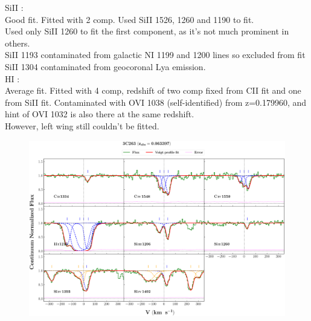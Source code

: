 \documentclass[12pt,draft]{report}
\begin{document}
SiII :  \\  \hspace*{1.5cm}
        Good fit. Fitted with 2 comp. Used SiII 1526, 1260 and 1190 to fit. \\
        Used only SiII 1260 to fit the first component, as it's not much prominent in others. \\
        SiII 1193 contaminated from galactic NI 1199 and 1200 lines so excluded from fit \\
        SiII 1304 contaminated from geocoronal Lya emission. \\

HI :  \\  \hspace*{1.5cm}
        Average fit. Fitted with 4 comp, redshift of two comp fixed from CII fit and one from SiII fit. Contaminated with OVI 1038 (self-identified) from z=0.179960, and hint of OVI 1032 is also there at the same redshift. \\
        However, left wing still couldn't be fitted.


\newpage

\begin{landscape}

\begin{figure}
    \centering
    \vspace{-20mm}
    \hspace*{-35mm}
    \includegraphics[width=1.25\linewidth]{System-Plots/3C263_z=0.063397_sys_plot.png}
\end{figure}

\end{landscape}
\end{document}
